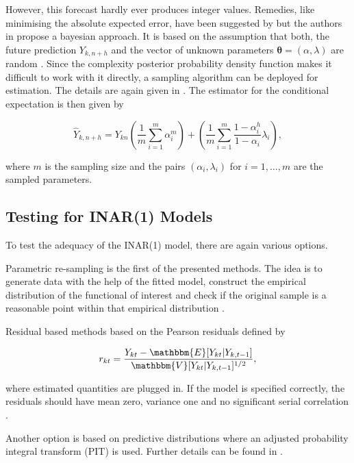 However, this forecast hardly ever produces integer values. Remedies, like minimising the absolute expected error, have been suggested by \cite{Freeland:2004} but the authors in \cite{Silva:2005} propose a bayesian approach. It is based on the assumption that both, the future prediction $Y_{k,n+h}$ and the vector of unknown parameters $\bm{\theta}=(\alpha,\lambda)$ are random \cite{Silva:2005}. Since the complexity posterior probability density function makes it difficult to work with it directly, a sampling algorithm can be deployed for estimation. The details are again given in \cite{Silva:2005}. The estimator for the conditional expectation is then given by

\begin{equation}
\hat{Y}_{k,n+h}= Y_{kn}\left(\frac{1}{m} \sum_{i=1}^m\alpha_i^m\right) + \left(\frac{1}{m} \sum_{i=1}^m \frac{1-\alpha_i^h}{1-\alpha_i}\lambda_i\right),
\label{eq:Forecasting Bayesian}
\end{equation}

where $m$ is the sampling size and the pairs $(\alpha_i,\lambda_i)$ for $i=1,\ldots,m$ are the sampled parameters. 

\subsection{Testing for INAR(1) Models}
\label{sec:Testing for INAR(1) Models}

To test the adequacy of the INAR(1) model, there are again various options. 

Parametric re-sampling is the first of the presented methods. The idea is to generate data with the help of the fitted model, construct the empirical distribution of the functional of interest and check if the original sample is a reasonable point within that empirical distribution \cite{Silva:2005}. 

Residual based methods based on the Pearson residuals defined by 

\begin{equation}
r_{kt} = \frac{Y_{kt}-\mathbbm{E}[Y_{kt}|Y_{k,t-1}]}{\mathbbm{V}[Y_{kt}|Y_{k,t-1}]^{1/2}},
\label{eq:Pearson residuals}
\end{equation}

where estimated quantities are plugged in. If the model is specified correctly, the residuals should have mean zero, variance one and no significant serial correlation \cite{Silva:2005}. 

Another option is based on predictive distributions where an adjusted probability integral transform (PIT) is used. Further details can be found in \cite{Silva:2005}. 

